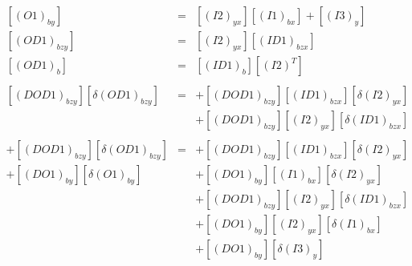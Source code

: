 \begin{eqnarray*}
\left[\left(O1\right)_{by}\right] & = & \left[\left(I2\right)_{yx}\right]\left[\left(I1\right)_{bx}\right]+\left[\left(I3\right)_{y}\right]\\
\left[\left(OD1\right)_{bzy}\right] & = & \left[\left(I2\right)_{yx}\right]\left[\left(ID1\right)_{bzx}\right]\\
\left[\left(OD1\right)_{b}\right] & = & \left[\left(ID1\right)_{b}\right]\left[\left(I2\right)^{T}\right]\\
\\
\left[\left(DOD1\right)_{bzy}\right]\left[\delta\left(OD1\right)_{bzy}\right] & = & +\left[\left(DOD1\right)_{bzy}\right]\left[\left(ID1\right)_{bzx}\right]\left[\delta\left(I2\right)_{yx}\right]\\
 &  & +\left[\left(DOD1\right)_{bzy}\right]\left[\left(I2\right)_{yx}\right]\left[\delta\left(ID1\right)_{bzx}\right]\\
\\
+\left[\left(DOD1\right)_{bzy}\right]\left[\delta\left(OD1\right)_{bzy}\right] & = & +\left[\left(DOD1\right)_{bzy}\right]\left[\left(ID1\right)_{bzx}\right]\left[\delta\left(I2\right)_{yx}\right]\\
+\left[\left(DO1\right)_{by}\right]\left[\delta\left(O1\right)_{by}\right] &  & +\left[\left(DO1\right)_{by}\right]\left[\left(I1\right)_{bx}\right]\left[\delta\left(I2\right)_{yx}\right]\\
 &  & +\left[\left(DOD1\right)_{bzy}\right]\left[\left(I2\right)_{yx}\right]\left[\delta\left(ID1\right)_{bzx}\right]\\
 &  & +\left[\left(DO1\right)_{by}\right]\left[\left(I2\right)_{yx}\right]\left[\delta\left(I1\right)_{bx}\right]\\
 &  & +\left[\left(DO1\right)_{by}\right]\left[\delta\left(I3\right)_{y}\right]
\end{eqnarray*}

